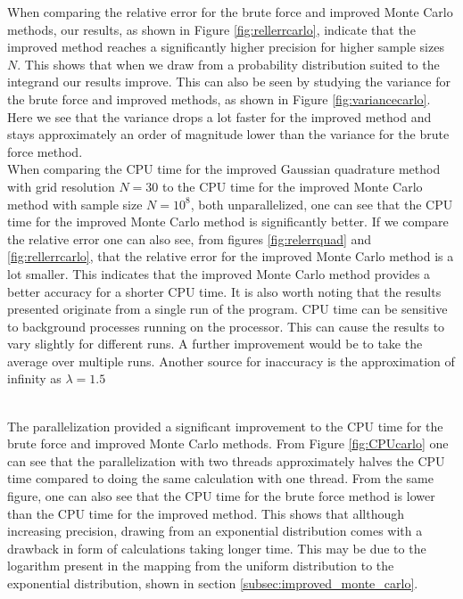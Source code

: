 \documentclass[10pt, twocolumn]{aastex62}
\begin{document}
When comparing the relative error for the brute force and improved Monte Carlo
methods, our results, as shown in Figure \ref{fig:rellerrcarlo}, indicate that
the improved method reaches a significantly higher precision for higher sample
sizes $N$. This shows that when we draw from a probability distribution suited
to the integrand our results improve. This can also be seen by studying the
variance for the brute force and improved methods, as shown in Figure
\ref{fig:variancecarlo}. Here we see that the variance drops a lot faster for
the improved method and stays approximately an order of magnitude lower than the
variance for the brute force method.\\\indent 
When comparing the CPU time for the improved Gaussian quadrature method with
grid resolution $N=30$ to the CPU time for the improved Monte Carlo method with
sample size $N=10^8$, both unparallelized, one can see that the CPU time for the
improved Monte Carlo method is significantly better. If we compare the relative
error one can also see, from figures \ref{fig:relerrquad} and
\ref{fig:rellerrcarlo}, that the relative error for the improved Monte Carlo
method is a lot smaller. This indicates that the improved Monte Carlo method
provides a better accuracy for a shorter CPU time. It is also worth noting that
the results presented originate from a single run of the program. CPU time can
be sensitive to background processes running on the processor. This can cause
the results to vary slightly for different runs. A further improvement would be
to take the average over multiple runs. Another source for inaccuracy is the
approximation of infinity as $\lambda = 1.5$\\\\\indent

The parallelization provided a significant improvement to the CPU time for the
brute force and improved Monte Carlo methods. From Figure \ref{fig:CPUcarlo} one
can see that the parallelization with two threads approximately halves the CPU
time compared to doing the same calculation with one thread. From the same
figure, one can also see that the CPU time for the brute force method is
lower than the CPU time for the improved method. This shows that allthough increasing
precision, drawing from an exponential distribution comes with a drawback in
form of calculations taking longer time. This may be due to the logarithm
present in the mapping from the uniform distribution to the exponential
distribution, shown in section \ref{subsec:improved_monte_carlo}.\\
\end{document}
